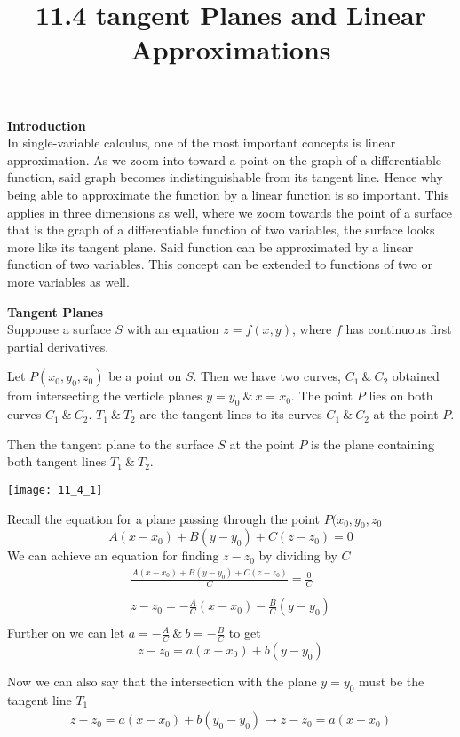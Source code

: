 \documentclass{article}
\title{11.4 tangent Planes and Linear Approximations}
\begin{document}
  \maketitle
  \textbf{Introduction}\\
  In single-variable calculus, one of the most important concepts is linear approximation. As we zoom into toward a point on the graph of a differentiable function, said graph becomes indistinguishable from its tangent line. Hence why being able to approximate the function by a linear function is so important. This applies in three dimensions as well, where we zoom towards the point of a surface that is the graph of a differentiable function of two variables, the surface looks more like its tangent plane. Said function can be approximated by a linear function of two variables. This concept can be extended to functions of two or more variables as well.

  \textbf{Tangent Planes}\\
  Suppouse a surface $ S $ with an equation $ z=f(x,y) $, where $ f $ has continuous first partial derivatives. 

  Let $ P(x_{0},y_{0},z_{0})$ be a point on $ S $. Then we have two curves, $ C_{1} ~\&~ C_{2}$ obtained from intersecting the verticle planes $ y=y_{0} ~\&~ x=x_{0}   $. The point $ P $ lies on both curves $ C_{1} ~\&~ C_{2}$. $ T_{1} ~\&~ T_{2}$ are the tangent lines to its curves $ C_{1} ~\&~ C_{2}$ at the point $ P $.  

  Then the tangent plane to the surface $ S $ at the point $ P $ is the plane containing both tangent lines $ T_{1} ~\&~ T_{2}$.  
  \begin{center}
    \texttt{[image: 11\_4\_1]}
  \end{center}

  Recall the equation for a plane passing through the point $ P(x_{0},y_{0} ,z_{0}$
  \[
    A(x-x_{0} )+B(y-y_{0} )+C(z-z_{0} )=0
  \]
  We can achieve an equation for finding $ z -z_{0} $ by dividing by $ C $
  \[
    \begin{gathered}
    \frac{A(x-x_{0} )+B(y-y_{0} )+C(z-z_{0} )}{C}=\frac{0}{C}\\
    ~\\
    z-z_{0}=-\frac{A}{C}(x-x_0)-\frac{B}{C}(y-y_{0} )\\
    \end{gathered}
  \]
  Further on we can let $ a=-\frac{A}{C} ~\&~ b=-\frac{B}{C}$ to get
  \[
    z-z_{0} =a(x-x_{0} )+b(y-y_{0} )
  \]

  Now we can also say that the intersection with the plane $ y=y_{0}$ must be the tangent line $ T_{1}$
  \[
    \begin{gathered}
    z-z_{0}=a(x-x_{0})+b(y_{0} -y_{0} ) \to 
    z-z_{0}=a(x-x_{0} ) 
    \end{gathered}
  \]
  
\end{document}
